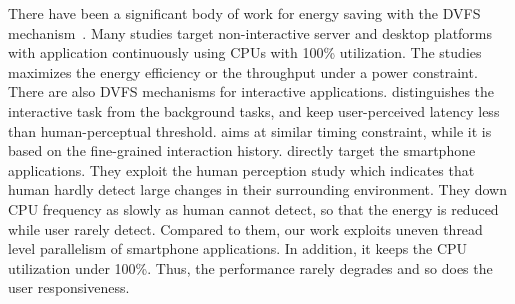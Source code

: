There have been a significant body of work for energy saving with the DVFS mechanism~\cite{decomposition, packandcap, micro06DVFS, isca11DVFS, Koala}. 
Many studies target non-interactive server and desktop platforms with application continuously using CPUs with 100\% utilization.
The studies maximizes the energy efficiency or the throughput under a power constraint.
There are also DVFS mechanisms for interactive applications.
\cite{transactionbased} distinguishes the interactive task from the background tasks,
and keep user-perceived latency less than human-perceptual threshold.
\cite{IADVS} aims at similar timing constraint, 
while it is based on the fine-grained interaction history.
\cite{intothewild} directly target the smartphone applications.
They exploit the human perception study 
which indicates that human hardly detect large changes in their surrounding environment.
They down CPU frequency as slowly as human cannot detect, so that the energy is reduced while user rarely detect.
Compared to them, our work exploits uneven thread level parallelism of smartphone applications.
In addition, it keeps the CPU utilization under 100\%.
Thus, the performance rarely degrades and so does the user responsiveness.
